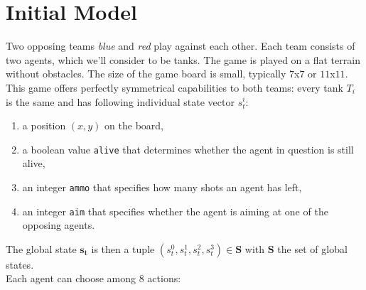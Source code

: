 \section{Initial Model}
\label{sec:first_model}
Two opposing teams \emph{blue} and \emph{red} play against each other. Each team consists of two agents, which we'll consider to be tanks. The game is played on a flat terrain without obstacles. The size of the game board is small, typically $7$x$7$ or $11$x$11$.\\
This game offers perfectly symmetrical capabilities to both teams: every tank $T_i$ is the same and has following individual state vector $s^i_t$:
\begin{enumerate}
    \item a position $(x,y)$ on the board,
    \item a boolean value {\tt alive} that determines whether the agent in question is still alive,
    \item an integer {\tt ammo} that specifies how many shots an agent has left,
    \item an integer {\tt aim} that specifies whether the agent is aiming at one of the opposing agents.
\end{enumerate}
The global state $\bm{s_t}$ is then a tuple $(s_t^0, s_t^1, s_t^2, s_t^3) \in \bm{S}$ with $\bm{S}$ the set of global states.\\
Each agent can choose among $8$ actions:
